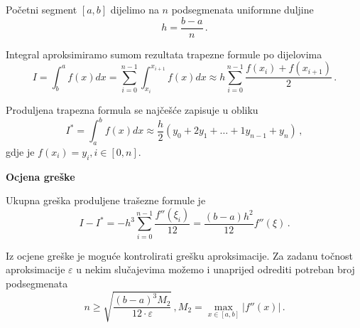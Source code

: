 Početni segment $[a,b]$ dijelimo na $n$ podsegmenata uniformne duljine
$$
h = \frac{b-a}{n}\,.
$$

Integral aproksimiramo sumom rezultata trapezne formule po dijelovima
$$
I = \int_{b}^{a} f(x)dx = \sum_{i=0}^{n-1} \int_{x_i}^{x_{i+1}}f(x)dx \approx h \sum_{i=0}^{n-1} \frac{f(x_i)+f(x_{i+1})}{2}\,.
$$

Produljena trapezna formula se najčešće zapisuje u obliku
$$
I^* = \int_{a}^{b} f(x)dx \approx \frac{h}{2}(y_0+2y_1+\dots+1y_{n-1}+y_n)\,,
$$
gdje je $f(x_i) = y_i, i\in [0, n]$.



\bigskip
\noindent
\textbf{Ocjena greške}

Ukupna greška produljene trašezne formule je
$$
I - I^* = -h^3 \sum_{i=0}^{n-1} \frac{f''(\xi_i)}{12} = \frac{(b-a)h^2}{12}f''(\xi)\,.
$$

Iz ocjene greške je moguće kontrolirati grešku aproksimacije.
Za zadanu točnost aproksimacije $\varepsilon$ u nekim slučajevima možemo i unaprijed odrediti potreban broj podsegmenata
$$
n \geq \sqrt{\frac{(b-a)^3M_2}{12 \cdot \varepsilon}}\,, M_2 = \max_{x\in[a,b]}|f''(x)|\,.
$$
